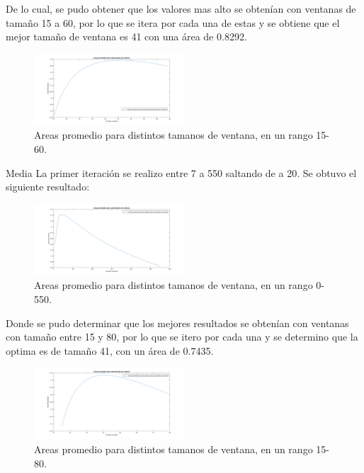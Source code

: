 De lo cual, se pudo obtener que los valores mas alto se obtenían con ventanas de tamaño 15 a 60, por lo que se itera por cada una de estas y se obtiene que el mejor tamaño de ventana es 41 con una área de 0.8292.

	\begin{figure}[h]
	{
	\centering
	\includegraphics[width=0.50\textwidth]{Figures/MedianaRangoChico}
	\caption[An Electron]{Areas promedio para distintos tamanos de ventana, en un rango 15-60.}
	}
	\end{figure}	

Media 
La primer iteración se realizo entre 7 a 550 saltando de a 20. Se obtuvo el siguiente resultado:

\begin{figure}[h]
	{
	\centering
	\includegraphics[width=0.50\textwidth]{Figures/MediaRangoGrande}
	\caption[An Electron]{Areas promedio para distintos tamanos de ventana, en un rango 0-550.}
	}
\end{figure}

Donde se pudo determinar que los mejores resultados se obtenían con ventanas con tamaño entre 15 y 80, por lo que se itero por cada una y se determino que la optima es de tamaño 41, con un área de 0.7435.

\begin{figure}[h]
	{
	\centering
	\includegraphics[width=0.50\textwidth]{Figures/MediaRangoChico}
	\caption[An Electron]{Areas promedio para distintos tamanos de ventana, en un rango 15-80.}
	}
\end{figure}

